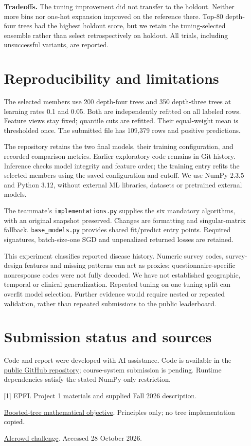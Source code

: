 \documentclass[10pt,conference,compsocconf]{IEEEtran}
\begin{document}
\textbf{Tradeoffs.} The tuning improvement did not transfer to the holdout. Neither more bins nor one-hot expansion improved on the reference there. Top-80 depth-four trees had the highest holdout score, but we retain the tuning-selected ensemble rather than select retrospectively on holdout. All trials, including unsuccessful variants, are reported.

\section{Reproducibility and limitations}
The selected members use 200 depth-four trees and 350 depth-three trees at learning rates 0.1 and 0.05. Both are independently refitted on all labeled rows. Feature views stay fixed; quantile cuts are refitted. Their equal-weight mean is thresholded once. The submitted file has 109,379 rows and \PositiveCount{} positive predictions.

\newpage
The repository retains the two final models, their training configuration, and recorded comparison metrics. Earlier exploratory code remains in Git history. Inference checks model integrity and feature order; the training entry refits the selected members using the saved configuration and cutoff. We use NumPy 2.3.5 and Python 3.12, without external ML libraries, datasets or pretrained external models.

The teammate's \texttt{implementations.py} supplies the six mandatory algorithms, with an original snapshot preserved. Changes are formatting and singular-matrix fallback. \texttt{base\_models.py} provides shared fit/predict entry points. Required signatures, batch-size-one SGD and unpenalized returned losses are retained.

This experiment classifies reported disease history. Numeric survey codes, survey-design features and missing patterns can act as proxies; questionnaire-specific nonresponse codes were not fully decoded. We have not established geographic, temporal or clinical generalization. Repeated tuning on one tuning split can overfit model selection. Further evidence would require nested or repeated validation, rather than repeated submissions to the public leaderboard.

\section{Submission status and sources}
Code and report were developed with AI assistance. Code is available in the \href{https://github.com/inori0cc/epfl-ml-project1-2026}{public GitHub repository}; course-system submission is pending. Runtime dependencies satisfy the stated NumPy-only restriction.

\small
[1] \href{https://github.com/epfml/ML_course/tree/main/projects/project1}{EPFL Project 1 materials} and supplied Fall 2026 description.\par
[2] \href{https://xgboost.readthedocs.io/en/stable/tutorials/model.html}{Boosted-tree mathematical objective}. Principles only; no tree implementation copied.\par
[3] \href{https://www.aicrowd.com/challenges/epfl-machine-learning-project-1}{AIcrowd challenge}. Accessed 28 October 2026.
\end{document}
